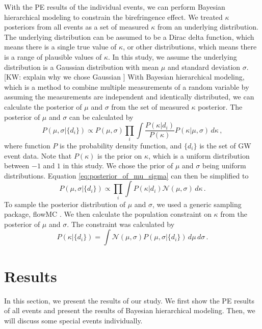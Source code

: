 \documentclass[aps,prd,twocolumn,superscriptaddress,preprintnumbers,floatfix,nofootinbib]{revtex4-2}
\newcommand{\kw}[1]{{\color{rb4}[KW: #1 ]}}
\begin{document}
With the PE results of the individual events, we can perform Bayesian hierarchical modeling to constrain the birefringence effect.
We treated $\kappa$ posteriors from all events as a set of measured $\kappa$ from an underlying distribution.
The underlying distribution can be assumed to be a Dirac delta function, which means there is a single true value of $\kappa$, or other distributions, which means there is a range of plausible values of $\kappa$.
In this study, we assume the underlying distribution is a Gaussian distribution with mean $\mu$ and standard deviation $\sigma$.
\kw{explain why we chose Gaussian}
With Bayesian hierarchical modeling, which is a method to combine multiple measurements of a random variable by assuming the measurements are independent and identically distributed, we can calculate the posterior of $\mu$ and $\sigma$ from the set of measured $\kappa$ posterior.
The posterior of $\mu$ and $\sigma$ can be calculated by
\begin{equation}
    P(\mu,\sigma|\{d_i\})\propto P(\mu,\sigma)\prod_{i}\int\frac{P(\kappa|d_i)}{P(\kappa)}P(\kappa|\mu,\sigma)\,d\kappa\,,
    \label{eq:posterior_of_mu_sigma}
\end{equation}
where function $P$ is the probability density function, and $\{d_i\}$ is the set of GW event data.
Note that $P(\kappa)$ is the prior on $\kappa$, which is a uniform distribution between $-1$ and $1$ in this study.
We chose the prior of $\mu$ and $\sigma$ being uniform distributions.
Equation \ref{eq:posterior_of_mu_sigma} can then be simplified to
\begin{equation}
    P(\mu,\sigma|\{d_i\})\propto\prod_{i}\int P(\kappa|d_i)\mathcal{N}(\mu,\sigma)\,d\kappa\,.
\end{equation}
To sample the posterior distribution of $\mu$ and $\sigma$, we used a generic sampling package, flowMC \citep{flowMC}.
We then calculate the population constraint on $\kappa$ from the posterior of $\mu$ and $\sigma$.
The constraint was calculated by
\begin{equation}
    P(\kappa|\{d_i\})=\int \mathcal{N}(\mu,\sigma)P(\mu,\sigma|\{d_i\})\,d\mu\,d\sigma\,.
\end{equation}

\section{Results}
\label{sec:Results}
In this section, we present the results of our study.
We first show the PE results of all events and present the results of Bayesian hierarchical modeling.
Then, we will discuss some special events individually.
\end{document}
